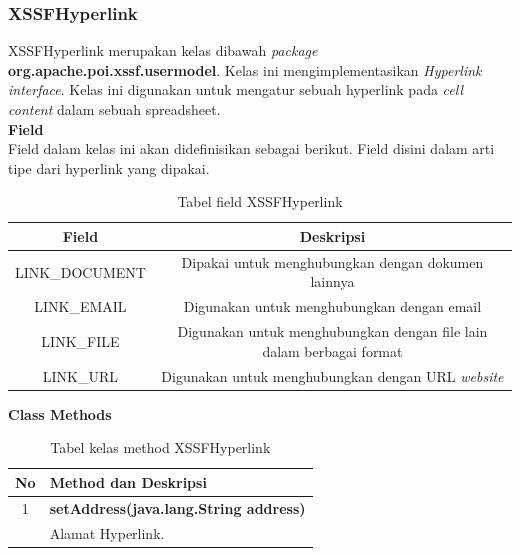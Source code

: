 \subsubsection{XSSFHyperlink}
\label{subs:XSSFHyperlink}
XSSFHyperlink merupakan kelas dibawah \textit{package} \textbf{org.apache.poi.xssf.usermodel}. Kelas ini mengimplementasikan \textit{Hyperlink interface}. Kelas ini digunakan untuk mengatur sebuah hyperlink pada \textit{cell content} dalam sebuah spreadsheet.\cite{apachepoi2}
\\
\noindent \textbf{Field}\\
Field dalam kelas ini akan didefinisikan sebagai berikut. Field disini dalam arti tipe dari hyperlink yang dipakai.
\begin{table}[H]
		\centering
		\caption{Tabel field XSSFHyperlink}
		\label{tab:fieldXSSFHyperlink}
\begin{tabular}{|c|c|}
		\hline
		\textbf{Field} & \textbf{Deskripsi} \\ \hline \hline
		LINK\_DOCUMENT & Dipakai untuk menghubungkan dengan dokumen lainnya\\ \hline 
		LINK\_EMAIL &	Digunakan untuk menghubungkan dengan email\\ \hline 
		LINK\_FILE & Digunakan untuk menghubungkan dengan file lain dalam berbagai format \\ \hline
		LINK\_URL	&	Digunakan untuk menghubungkan dengan URL \textit{website}\\ \hline
	\end{tabular}
\end{table}

	\noindent \textbf{Class Methods}
	\begin{table}[H]
		\centering
		\caption{Tabel kelas method XSSFHyperlink}
		\label{tab:methodXSSFHyperlink}
	\begin{tabular}{|c|p{12cm}|}
		\hline
		\textbf{No} & \textbf{Method dan Deskripsi} \\ \hline \hline
		1 & \textbf{setAddress(java.lang.String address)}\\
			&	Alamat Hyperlink.\\ \hline
	\end{tabular}
\end{table}

